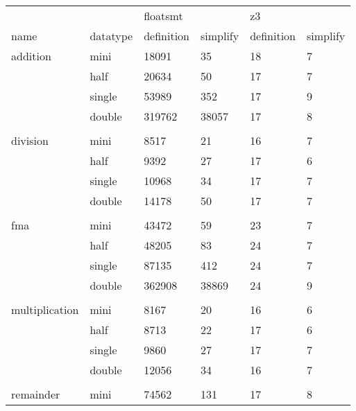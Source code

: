 \documentclass[a4paper,UKenglish,cleveref, autoref, thm-restate]{lipics-v2019}
\begin{document}
\begin{center}	
	\begin{table}[]
		\begin{tabular}{ll|ll|ll}
			&          & floatsmt  &          & z3         &          \\
			name           & datatype & definition & simplify & definition & simplify \\ \hline
			addition       & mini     & 18091      & 35       & 18         & 7        \\
			& half     & 20634      & 50       & 17         & 7        \\
			& single   & 53989      & 352      & 17         & 9        \\
			& double   & 319762     & 38057    & 17         & 8        \\
			&          &            &          &            &          \\
			division       & mini     & 8517       & 21       & 16         & 7        \\
			& half     & 9392       & 27       & 17         & 6        \\
			& single   & 10968      & 34       & 17         & 7        \\
			& double   & 14178      & 50       & 17         & 7        \\
			&          &            &          &            &          \\
			fma            & mini     & 43472      & 59       & 23         & 7        \\
			& half     & 48205      & 83       & 24         & 7        \\
			& single   & 87135      & 412      & 24         & 7        \\
			& double   & 362908     & 38869    & 24         & 9        \\
			&          &            &          &            &          \\
			multiplication & mini     & 8167       & 20       & 16         & 6        \\
			& half     & 8713       & 22       & 17         & 6        \\
			& single   & 9860       & 27       & 17         & 7        \\
			& double   & 12056      & 34       & 16         & 7        \\
			&          &            &          &            &          \\
			remainder      & mini     & 74562      & 131      & 17         & 8        \\

\end{tabular}
\end{table}
\end{center}
\end{document}
